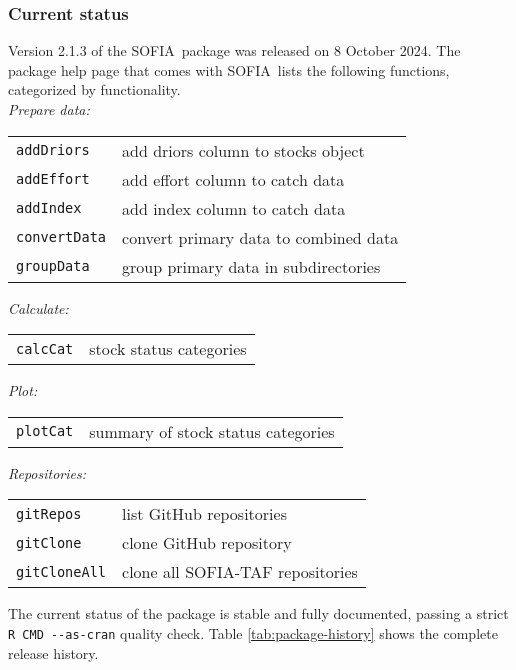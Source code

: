 \documentclass[12pt]{article}
\newcommand\SOFIA{{\sf SOFIA}}
\begin{document}
\subsubsection{Current status}

Version 2.1.3 of the \SOFIA\ package was released on 8 October 2024. The package
help page that comes with \SOFIA\ lists the following functions, categorized by
functionality.\\[-2ex]

{\it Prepare data:}

\begin{tabular}{ll}
  \verb|addDriors|   & add driors column to stocks object\\
  \verb|addEffort|   & add effort column to catch data\\
  \verb|addIndex|    & add index column to catch data\\
  \verb|convertData| & convert primary data to combined data\\
  \verb|groupData|   & group primary data in subdirectories\\[1.5ex]
\end{tabular}

{\it Calculate:}

\begin{tabular}{ll}
  \verb|calcCat| & stock status categories\\[1.5ex]
\end{tabular}

{\it Plot:}

\begin{tabular}{ll}
  \verb|plotCat| & summary of stock status categories\\[1.5ex]
\end{tabular}

{\it Repositories:}

\begin{tabular}{ll}
  \verb|gitRepos|    & list GitHub repositories\\
  \verb|gitClone|    & clone GitHub repository\\
  \verb|gitCloneAll| & clone all SOFIA-TAF repositories\\[1.5ex]
\end{tabular}

The current status of the package is stable and fully documented, passing a
strict \verb|R CMD --as-cran| quality check. Table \ref{tab:package-history}
shows the complete release history.

\newpage
\end{document}
